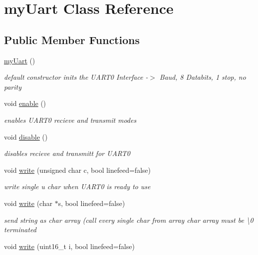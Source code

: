 \hypertarget{classmy_uart}{}\section{my\+Uart Class Reference}
\label{classmy_uart}
\subsection*{Public Member Functions}
\begin{DoxyCompactItemize}
\item 
\hyperlink{classmy_uart_a1f58c3b9bd581805e64120e1c03a83af}{my\+Uart} ()
\begin{DoxyCompactList}\small\item\em default constructor inits the U\+A\+R\+T0 Interface -\/$>$ Baud, 8 Databits, 1 stop, no parity \end{DoxyCompactList}\item 
void \hyperlink{classmy_uart_ab6a6bcf4fe99fb9e4dc5e69f57600488}{enable} ()
\begin{DoxyCompactList}\small\item\em enables U\+A\+R\+T0 recieve and transmit modes \end{DoxyCompactList}\item 
void \hyperlink{classmy_uart_a45e1a479b7775961d452e4000f599769}{disable} ()
\begin{DoxyCompactList}\small\item\em disables recieve and transmitt for U\+A\+R\+T0 \end{DoxyCompactList}\item 
void \hyperlink{classmy_uart_adf132d7000ec0061040552a91097e065}{write} (unsigned char c, bool linefeed=false)
\begin{DoxyCompactList}\small\item\em write single u char when U\+A\+R\+T0 is ready to use \end{DoxyCompactList}\item 
void \hyperlink{classmy_uart_a1427c57d57b93ea2e34679e9080051a9}{write} (char $\ast$s, bool linefeed=false)
\begin{DoxyCompactList}\small\item\em send string as char array (call every single char from array char array must be \textquotesingle{}\textbackslash{}0\textquotesingle{} terminated \end{DoxyCompactList}\item 
void \hyperlink{classmy_uart_a0807f0ccd0457eb6965513fed7a8c699}{write} (uint16\+\_\+t i, bool linefeed=false)

\end{DoxyCompactItemize}
